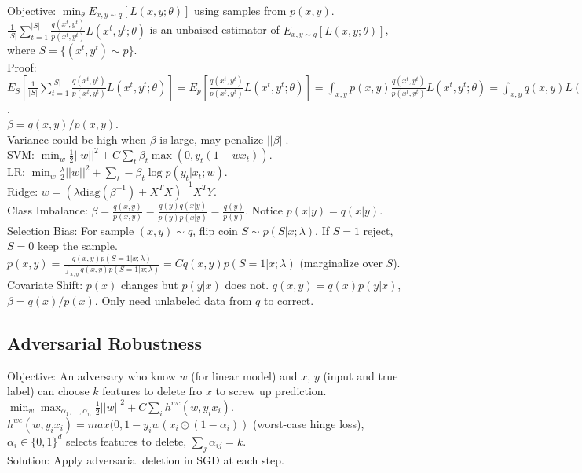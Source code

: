 Objective: $\min_\theta E_{x, y\sim q}[L(x, y; \theta)]$ using samples from $p(x, y)$.\\
$\frac{1}{|S|}\sum_{t=1}^{|S|}\frac{q(x^t, y^t)}{p(x^t, y^t)}L(x^t, y^t; \theta)$ is an unbaised estimator of $E_{x, y\sim q}[L(x, y; \theta)]$, where $S=\{(x^t, y^t)\sim p\}$.\\
Proof: $E_S[\frac{1}{|S|}\sum_{t=1}^{|S|}\frac{q(x^t, y^t)}{p(x^t, y^t)}L(x^t, y^t; \theta)]=E_p[\frac{q(x^t, y^t)}{p(x^t, y^t)}L(x^t, y^t; \theta)]=\int_{x, y}p(x,y)\frac{q(x^t, y^t)}{p(x^t, y^t)}L(x^t, y^t; \theta)=\int_{x, y}q(x, y)L(x, y; \theta) = E_q[L(x, y; \theta)]$.\\
$\beta = q(x, y) / p(x, y)$.\\
Variance could be high when $\beta$ is large, may penalize $||\beta||$.\\
SVM: $\min_w \frac{1}{2} ||w||^2 + C \sum_t \beta_t \max(0, y_t(1-wx_t))$.\\
LR: $\min_w \frac{\lambda}{2}||w||^2 + \sum_t -\beta_t \log p(y_t|x_t; w)$.\\
Ridge: $w=(\lambda \text{diag}(\beta^{-1})+ X^TX)^{-1}X^TY$.\\
Class Imbalance: $\beta = \frac{q(x, y)}{p(x, y)} = \frac{q(y)q(x|y)}{p(y)p(x|y)} = \frac{q(y)}{p(y)}$. Notice $p(x|y)=q(x|y)$.\\
Selection Bias: For sample $(x, y) \sim q$, flip coin $S \sim p(S | x; \lambda)$. If $S=1$ reject, $S=0$ keep the sample. $p(x, y) = \frac{q(x, y) p(S=1|x; \lambda)}{\int_{x, y}q(x, y) p(S=1|x; \lambda)} = Cq(x, y)p(S=1|x; \lambda)$ (marginalize over $S$).\\
Covariate Shift: $p(x)$ changes but $p(y|x)$ does not. $q(x, y) = q(x)p(y|x)$, $\beta = q(x)/p(x)$. Only need unlabeled data from $q$ to correct.

\subsection*{Adversarial Robustness}

Objective: An adversary who know $w$ (for linear model) and $x$, $y$ (input and true label) can choose $k$ features to delete fro $x$ to screw up prediction.\\
$\min_w \max_{\alpha_1, \dots, \alpha_n} \frac{1}{2}||w||^2+C\sum_i h^{wc}(w, y_i x_i)$.\\
$h^{wc}(w, y_i x_i) = max(0, 1-y_iw(x_i \odot (1-\alpha_i))$ (worst-case hinge loss), $\alpha_i\in\{0, 1\}^d$ selects features to delete, $\sum_j \alpha_{ij} = k$.\\
Solution: Apply adversarial deletion in SGD at each step.

